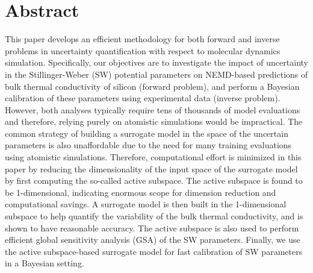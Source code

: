 \section*{Abstract}
This paper develops an efficient methodology for both forward and inverse 
problems in uncertainty quantification with respect to molecular dynamics simulation.
Specifically, our objectives are to investigate the impact of uncertainty in the
Stillinger-Weber (SW) potential parameters on NEMD-based predictions of bulk
thermal conductivity of silicon (forward problem), and perform a Bayesian calibration
of these parameters using experimental data (inverse problem). 
However, both analyses typically require tens of thousands of model evaluations
and therefore, relying purely on atomistic simulations would be impractical.
The common strategy of building a surrogate model in the space of the uncertain
parameters is also unaffordable due to the need for many training evaluations
using atomistic simulations. Therefore, computational effort 
is minimized in this paper by reducing the
dimensionality of the input space of the surrogate model by first computing
the so-called active subspace.
The active subspace is found to be
1-dimensional, indicating enormous scope for dimension reduction and
computational savings. A surrogate model is 
then built in the 1-dimensional subspace to help quantify
the variability of the bulk thermal conductivity, and is shown to have
reasonable accuracy. The
active subspace is also used to perform efficient global sensitivity analysis (GSA)
of the SW parameters. Finally, we use the active subspace-based
surrogate model for fast calibration of SW parameters in a Bayesian setting.  
